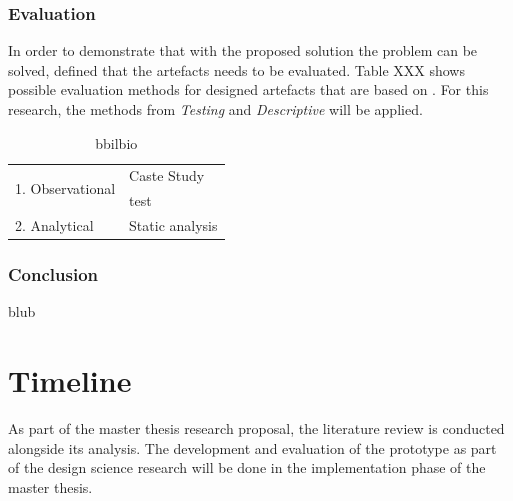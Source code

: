 
\subsubsection{Evaluation}

In order to demonstrate that with the proposed solution the problem can be solved, \cite{Hevner2010}  defined that the artefacts needs to be evaluated.
Table XXX shows possible evaluation methods for designed artefacts  that are based on \cite{Hevner2004}. For this research, the methods from \textit{Testing} and \textit{Descriptive} will be applied.


\begin{table}[h]
	\begin{center}
		\begin{tabular}{ | p{4cm} | p{9cm} | } 
			\hline
			\multirow{ 2}{*}{1. Observational} &
			Caste Study \\
			& \hline test \\
			\hline
			2. Analytical &
			Static analysis \\
			\hline
		\end{tabular}
		\caption[here]{bbilbio}
		\label{tbl:designevaluationmethods}
	\end{center}
\end{table}



\subsubsection{Conclusion}

blub



\section{Timeline}

As part of the master thesis research proposal, the literature review is conducted alongside its analysis. The development and evaluation of the prototype as part of the design science research will be done in the implementation phase of the master thesis.


